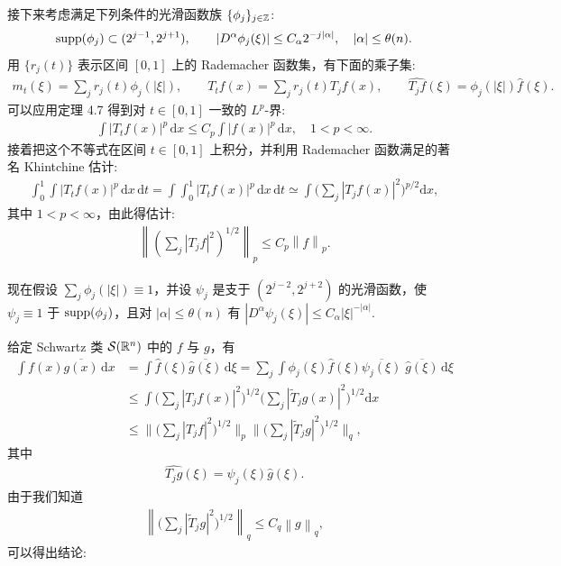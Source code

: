 接下来考虑满足下列条件的光滑函数族 $\{\phi_j\}_{j\in\mathbb{Z}}$:
\begin{align*}
  \operatorname{supp}(\phi_{j})\subset(2^{j-1},2^{j+1}),\qquad
  |D^{\alpha}\phi_{j}(\xi)|\leq C_{\alpha}2^{-j|\alpha|},\quad |\alpha|\leq\theta(n).
\end{align*}
用 $\{r_j(t)\}$ 表示区间 $[0,1]$ 上的 Rademacher 函数集，有下面的乘子集:
\begin{align*}
  m_{t}(\xi)=\sum_{j}r_{j}(t)\phi_{j}(|\xi|),\qquad
  T_{t}f(x)=\sum_{j}r_{j}(t)T_{j}f(x),\qquad
  \widehat{T_{j}f}(\xi)=\phi_{j}(|\xi|)\widehat{f}(\xi).
\end{align*}
可以应用定理 4.7 得到对 $t \in [0,1]$ 一致的 $L^p$-界:
\begin{align*}
  \int|T_{t}f(x)|^{p}\,\mathrm{d}x\leq C_{p}\int|f(x)|^{p}\,\mathrm{d}x,\quad 1<p<\infty.
\end{align*}
接着把这个不等式在区间 $t \in [0,1]$ 上积分，并利用 Rademacher 函数满足的著名 Khintchine 估计:
\begin{align*}
  \int_{0}^{1}\int|T_{t}f(x)|^{p}\,\mathrm{d}x\,\mathrm{d}t
  =\int\int_{0}^{1}|T_{t}f(x)|^{p}\,\mathrm{d}x\,\mathrm{d}t
  \simeq\int\Big(\sum_{j}|T_{j}f(x)|^{2}\Big)^{p/2}\mathrm{d}x,
\end{align*}
其中 $1 < p < \infty$，由此得估计:
\begin{align*}
  \left\|\left(\sum_{j}|T_{j}f|^{2}\right)^{1/2}\right\|_{p}\leq C_{p}\left\|f\right\|_{p}.
\end{align*}

现在假设 $\sum_j \phi_j(|\xi|) \equiv 1$，并设 $\psi_j$ 是支于 $(2^{j-2}, 2^{j+2})$ 的光滑函数，使 $\psi_j \equiv 1$ 于 $\operatorname{supp}(\phi_j)$，且对 $|\alpha| \leq \theta(n)$ 有 $|D^\alpha \psi_j(\xi)| \leq C_\alpha |\xi|^{-|\alpha|}$.

给定 Schwartz 类 $\mathcal{S}(\mathbb{R}^{n})$ 中的 $f$ 与 $g$，有
\begin{align*}
  \int f(x)\overline{g(x)}\,\mathrm{d}x
  &=\int\widehat{f}(\xi)\overline{\widehat{g}(\xi)}\,\mathrm{d}\xi
  =\sum_{j}\int\phi_{j}(\xi)\widehat{f}(\xi)\overline{\psi_{j}(\xi)}\;\overline{\widehat{g}(\xi)}\,\mathrm{d}\xi\\
  &\leq\int\Big(\sum_{j}|T_{j} f(x)|^{2}\Big)^{1/2}\Big(\sum_{j}|\widetilde{T}_{j} g(x)|^{2}\Big)^{1/2}\mathrm{d}x\\
  &\leq\Big\|\Big(\sum_{j}|T_{j} f|^{2}\Big)^{1/2}\Big\|_{p}\Big\|\Big(\sum_{j}|\widetilde{T}_{j} g|^{2}\Big)^{1/2}\Big\|_{q},
\end{align*}
其中
\begin{align*}
  \widehat{T_{j}g}(\xi)=\psi_{j}(\xi)\widehat{g}(\xi).
\end{align*}
由于我们知道
\begin{align*}
  \left\|\Big(\sum_{j}|\widetilde{T}_{j}g|^{2}\Big)^{1/2}\right\|_{q}\leq C_{q}\left\|g\right\|_{q},
\end{align*}
可以得出结论:

